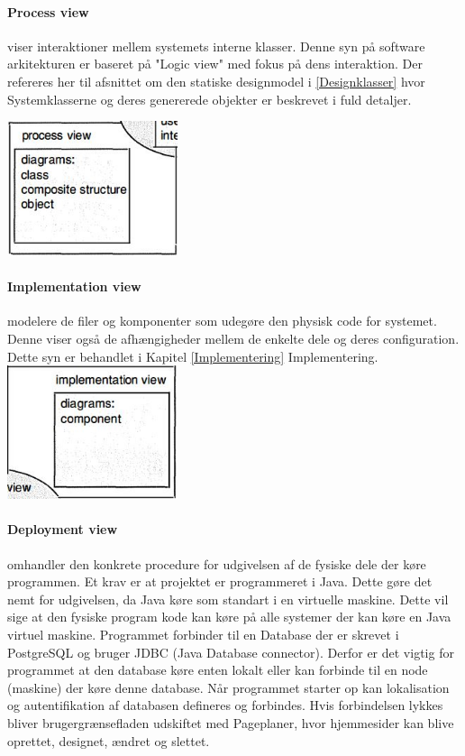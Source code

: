 \paragraph{Process view} viser interaktioner mellem systemets interne klasser. Denne syn på software arkitekturen er baseret på "Logic view" med fokus på dens interaktion. Der refereres her til afsnittet om den statiske designmodel i \ref{Designklasser} hvor Systemklasserne og deres genererede objekter er beskrevet i fuld detaljer.
 	 
     \includegraphics[width=5cm]{elaborationsdokumentet/figurer/design/soft-ark/UML2-ProcessView.JPG}

\clearpage
\paragraph{Implementation view} modelere de filer og komponenter som udegøre den physisk code for systemet. Denne viser også de afhængigheder mellem de enkelte dele og deres configuration. Dette syn er behandlet i Kapitel \ref{Implementering} Implementering.
	\\
 	 \includegraphics[width=5cm]{elaborationsdokumentet/figurer/design/soft-ark/UMP2-ImplementationView.JPG}


\paragraph{Deployment view} omhandler den konkrete procedure for udgivelsen af de fysiske dele der køre programmen. Et krav er at projektet er programmeret i Java. Dette gøre det nemt for udgivelsen, da Java køre som standart i en virtuelle maskine. Dette vil sige at den fysiske program kode kan køre på alle systemer der kan køre en Java virtuel maskine. Programmet forbinder til en Database der er skrevet i PostgreSQL og bruger JDBC (Java Database connector). Derfor er det vigtig for programmet at den database køre enten lokalt eller kan forbinde til en node (maskine) der køre denne database. Når programmet starter op kan lokalisation og autentifikation af databasen defineres og forbindes. Hvis forbindelsen lykkes bliver brugergrænsefladen udskiftet med Pageplaner, hvor hjemmesider kan blive oprettet, designet, ændret og slettet.

